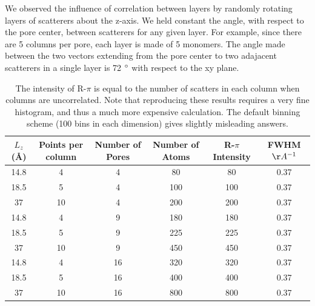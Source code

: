 \documentclass{article}
\begin{document}
  We observed the influence of correlation between layers by randomly rotating layers
  of scatterers about the z-axis. We held constant the angle, with respect to the pore
  center, between scatterers for any given layer. For example, since there are 5 
  columns per pore, each layer is made of 5 monomers. The angle made between the two 
  vectors extending from the pore center to two adajacent scatterers in a single layer
  is 72 $\degree$ with respect to the xy plane.  

  \begin{table}[!htb]
  \centering
  \begin{tabular}{c c c c c c}
  \toprule
  $L_z$ (\AA) & Points per column & Number of Pores & Number of Atoms & R-$\pi$ Intensity & FWHM $\AA^{-1}$ \\
  \midrule
  14.8        &      4            & 4               & 80              &  80               & 0.37           \\
  18.5        &      5            & 4               & 100             &  100              & 0.37           \\
  37          &      10           & 4               & 200             &  200              & 0.37           \\
  14.8        &      4            & 9               & 180             &  180              & 0.37           \\
  18.5        &      5            & 9               & 225             &  225              & 0.37           \\
  37          &      10           & 9               & 450             &  450              & 0.37           \\
  14.8        &      4            & 16              & 320             &  320              & 0.37           \\
  18.5        &      5            & 16              & 400             &  400              & 0.37           \\
  37          &      10           & 16              & 800             &  800              & 0.37           \\
  \bottomrule
  \end{tabular}
  \caption{The intensity of R-$\pi$ is equal to the number of scatters in
   each column when columns are uncorrelated. Note that reproducing these results requires a very fine histogram, 
   and thus a much more expensive calculation. The default binning scheme (100 bins in each dimension) gives slightly
   misleading answers.}\label{table:randomly_displaced_columns}
  \end{table}
\end{document}
